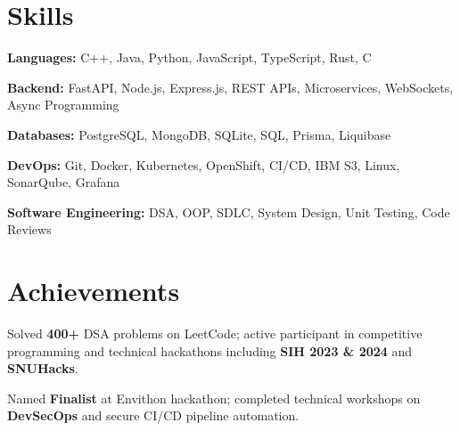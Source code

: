 \documentclass[letterpaper,10pt]{article}
\begin{document}
\section{Skills}
  \begin{itemize}[leftmargin=0.15in, label={$\bullet$}, itemsep=0pt]
    \small{
      \item \textbf{Languages:} C++, Java, Python, JavaScript, TypeScript, Rust, C
      \item \textbf{Backend:} FastAPI, Node.js, Express.js, REST APIs, Microservices, WebSockets, Async Programming
      \item \textbf{Databases:} PostgreSQL, MongoDB, SQLite, SQL, Prisma, Liquibase
      \item \textbf{DevOps:} Git, Docker, Kubernetes, OpenShift, CI/CD, IBM S3, Linux, SonarQube, Grafana
      \item \textbf{Software Engineering:} DSA, OOP, SDLC, System Design, Unit Testing, Code Reviews
    }
  \end{itemize}

\section{Achievements}
  \begin{itemize}[leftmargin=0.15in, label={$\bullet$}]
    \small{
      \item Solved \textbf{400+} DSA problems on LeetCode; active participant in competitive programming and technical hackathons including \textbf{SIH 2023 \& 2024} and \textbf{SNUHacks}.
      \item Named \textbf{Finalist} at Envithon hackathon; completed technical workshops on \textbf{DevSecOps} and secure CI/CD pipeline automation.
    }
  \end{itemize}
\end{document}
